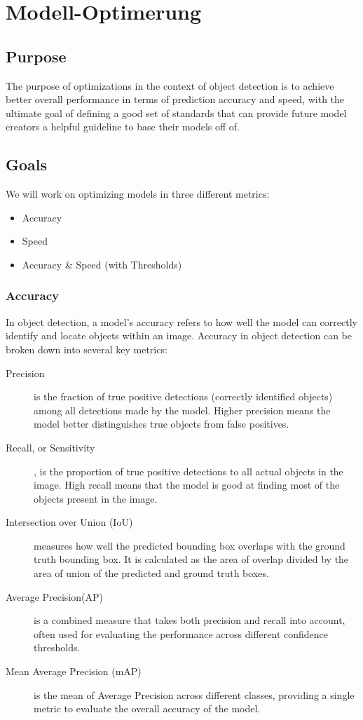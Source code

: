 \chapter{Modell-Optimerung}

\section{Purpose}
The purpose of optimizations in the context of object detection is to achieve better overall performance in terms of prediction accuracy and speed, with the ultimate goal of defining a good set of standards that can provide future model creators a helpful guideline to base their models off of.

\section{Goals}

We will work on optimizing models in three different metrics:
\begin{itemize}
\item{Accuracy}
\item{Speed}
\item{Accuracy \& Speed (with Thresholds)}
\end{itemize}

\subsection{Accuracy}
In object detection, a model's accuracy refers to how well the model can correctly identify and locate objects within an image. Accuracy in object detection can be broken down into several key metrics:

\begin{description}
\item[Precision] is the fraction of true positive detections (correctly identified objects) among all detections made by the model. Higher precision means the model better distinguishes true objects from false positives.

\item[Recall, or Sensitivity], is the proportion of true positive detections to all actual objects in the image. High recall means that the model is good at finding most of the objects present in the image.

\item[Intersection over Union (IoU)] measures how well the predicted bounding box overlaps with the ground truth bounding box. It is calculated as the area of overlap divided by the area of union of the predicted and ground truth boxes.

\item[Average Precision(AP)] is a combined measure that takes both precision and recall into account, often used for evaluating the performance across different confidence thresholds.

\item[Mean Average Precision (mAP)] is the mean of Average Precision across different classes, providing a single metric to evaluate the overall accuracy of the model.


\end{description}

